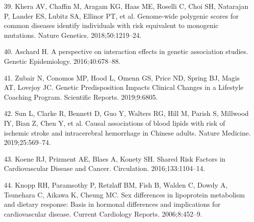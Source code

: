 \documentclass[]{article}
\begin{document}
\leavevmode\hypertarget{ref-Khera2018}{}%
39. Khera AV, Chaffin M, Aragam KG, Haas ME, Roselli C, Choi SH,
Natarajan P, Lander ES, Lubitz SA, Ellinor PT, et al. Genome-wide
polygenic scores for common diseases identify individuals with risk
equivalent to monogenic mutations. Nature Genetics. 2018;50:1219--24.

\leavevmode\hypertarget{ref-Aschard2016}{}%
40. Aschard H. A perspective on interaction effects in genetic
association studies. Genetic Epidemiology. 2016;40:678--88.

\leavevmode\hypertarget{ref-Zubair2019}{}%
41. Zubair N, Conomos MP, Hood L, Omenn GS, Price ND, Spring BJ, Magis
AT, Lovejoy JC. Genetic Predisposition Impacts Clinical Changes in a
Lifestyle Coaching Program. Scientific Reports. 2019;9:6805.

\leavevmode\hypertarget{ref-Sun2019a}{}%
42. Sun L, Clarke R, Bennett D, Guo Y, Walters RG, Hill M, Parish S,
Millwood IY, Bian Z, Chen Y, et al. Causal associations of blood lipids
with risk of ischemic stroke and intracerebral hemorrhage in Chinese
adults. Nature Medicine. 2019;25:569--74.

\leavevmode\hypertarget{ref-Koene2016}{}%
43. Koene RJ, Prizment AE, Blaes A, Konety SH. Shared Risk Factors in
Cardiovascular Disease and Cancer. Circulation. 2016;133:1104--14.

\leavevmode\hypertarget{ref-Knopp2006}{}%
44. Knopp RH, Paramsothy P, Retzlaff BM, Fish B, Walden C, Dowdy A,
Tsunehara C, Aikawa K, Cheung MC. Sex differences in lipoprotein
metabolism and dietary response: Basis in hormonal differences and
implications for cardiovascular disease. Current Cardiology Reports.
2006;8:452--9.
\end{document}
